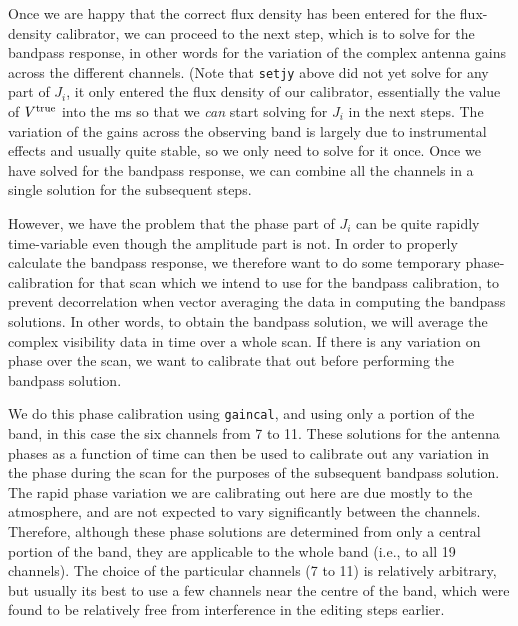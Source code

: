 \documentclass[force,almostfull,justified]{tufte-book}
\begin{document}
\medskip
Once we are happy that the correct flux density has been entered for the flux-density calibrator, we
can proceed to the next step, which is to solve for the bandpass response, in other words for the
variation of the complex antenna gains across the different channels.  (Note that {\tt setjy} above
did not yet solve for any part of $J_i$, it only entered the flux density of our calibrator,
essentially the value of $V^{\rm true}$ into the ms so that we {\em can} start solving for $J_i$ in
the next steps.  The variation of the gains across the observing band is largely due to instrumental
effects and usually quite stable, so we only need to solve for it once.  Once we have solved for the
bandpass response, we can combine all the channels in a single solution for the subsequent steps.

However, we have the problem that the phase part of $J_i$ can be quite rapidly time-variable even
though the amplitude part is not.  In order to properly calculate the bandpass response, we therefore
want to do some temporary phase-calibration for that scan which we intend to use for the bandpass
calibration, to prevent decorrelation when vector averaging the data in computing the bandpass
solutions.  In other words, to obtain the bandpass solution, we will average the complex visibility
data in time over a whole scan.  If there is any variation on phase over the scan, we want to
calibrate that out before performing the bandpass solution.

We do this phase calibration using {\tt gaincal}, and using only a portion of the band, in this case
the six channels from 7 to 11.  These solutions for the antenna phases as a function of time can then
be used to calibrate out any variation in the phase during the scan for the purposes of the subsequent
bandpass solution.  The rapid phase variation we are calibrating out here are due mostly to the
atmosphere, and are not expected to vary significantly between the channels.  Therefore, although
these phase solutions are determined from only a central portion of the band, they are applicable to
the whole band (i.e., to all 19 channels).  The choice of the particular channels (7 to 11) is
relatively arbitrary, but usually its best to use a few channels near the centre of the band, which
were found to be relatively free from interference in the editing steps earlier.
\end{document}
